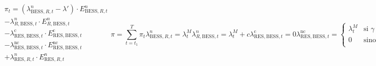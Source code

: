 \begin{subequations}
  \label{eq:beneficio}

  \begin{equation}
    \begin{split}
      \pi_{t}
      = (\lambda^{n}_{\text{BESS}, R, t} - \lambda')
      \cdot E^{n}_{\text{BESS}, R, t}\\
      - \lambda^{n}_{R, \text{BESS}, t}
      \cdot E^{n}_{R, \text{BESS}, t}\\
      - \lambda^{\text{c}}_{\text{RES}, \text{BESS}, t}
      \cdot E^{\text{c}}_{\text{RES}, \text{BESS}, t}\\
      - \lambda^{\text{nc}}_{\text{RES}, \text{BESS}, t}
      \cdot E^{\text{nc}}_{\text{RES}, \text{BESS}, t}\\
      + \lambda^{n}_{\text{RES}, R, t}
      \cdot E^{n}_{\text{RES}, R, t}\\
    \end{split}
  \end{equation}

  \begin{equation}
    \pi = \sum_{t = t_{1}}^{T} \pi_{t}
  \end{equation}

  \begin{equation}
    \lambda^{n}_{\text{BESS}, R, t} = \lambda^{M}_{t}
  \end{equation}

  \begin{equation}
    \lambda^{n}_{R, \text{BESS}, t} = \lambda^{M}_{t} + c
  \end{equation}

  \begin{equation}
    \lambda^{\text{c}}_{\text{RES}, \text{BESS}, t} = 0
  \end{equation}

  \begin{equation}
    \lambda^{\text{nc}}_{\text{RES}, \text{BESS}, t} =
    \begin{cases}
      \lambda^{M}_{t} & \text{si } \gamma \land \lambda^{M}_{t} \ge \lambda^{O}_{\text{RES}, t} \\
      0               & \text{sino}                                                             \\
    \end{cases}
  \end{equation}

  \begin{equation}
    \lambda^{n}_{\text{RES}, R, t} =
    \begin{cases}
      \lambda^{M}_{t} & \text{si } \lambda^{M}_{t} \ge \lambda^{O}_{\text{RES}, t} \\
      0               & \text{sino}                                                \\
    \end{cases}
\end{equation}

\end{subequations}

